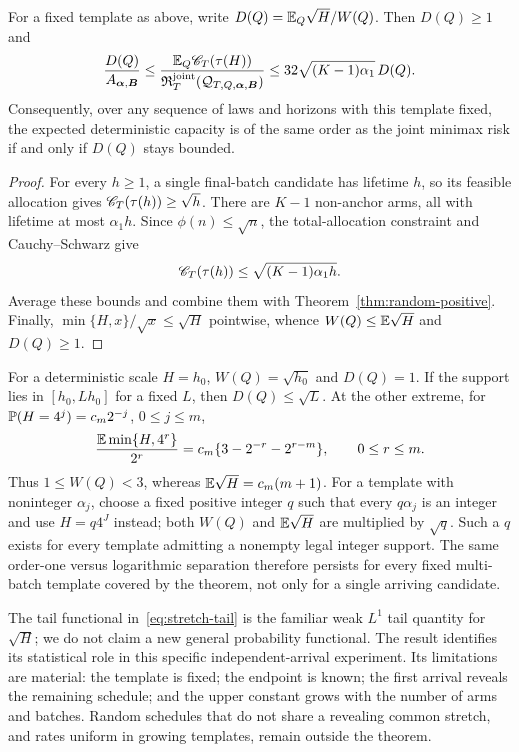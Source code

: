 \begin{corollary}
\label{cor:stretch-capacity}
For a fixed template as above, write
$D(Q)=\mathbb E_Q\sqrt H/W(Q)$. Then $D(Q)\ge1$ and
\begin{equation}
 \frac{D(Q)}{A_{\boldsymbol\alpha,\boldsymbol B}}
 \le
 \frac{\mathbb E_Q\mathscr C_T(\tau(H))}
      {\mathfrak R_T^{\mathrm{joint}}
       (\mathcal Q_{T,Q,\boldsymbol\alpha,\boldsymbol B})}
 \le32\sqrt{(K-1)\alpha_1}\,D(Q).
 \label{eq:stretch-capacity-ratio}
\end{equation}
Consequently, over any sequence of laws and horizons with this
template fixed, the expected deterministic capacity is of the same
order as the joint minimax risk if and only if $D(Q)$ stays bounded.
\end{corollary}

\begin{proof}
For every $h\ge1$, a single final-batch candidate has lifetime $h$,
so its feasible allocation gives $\mathscr C_T(\tau(h))\ge\sqrt h$.
There are $K-1$ non-anchor arms, all with lifetime at most
$\alpha_1h$. Since $\phi(n)\le\sqrt n$, the total-allocation
constraint and Cauchy--Schwarz give
\[
 \mathscr C_T(\tau(h))
 \le\sqrt{(K-1)\alpha_1h}.
\]
Average these bounds and combine them with
Theorem~\ref{thm:random-positive}. Finally,
$\min\{H,x\}/\sqrt x\le\sqrt H$ pointwise, whence
$W(Q)\le\mathbb E\sqrt H$ and $D(Q)\ge1$.
\end{proof}

For a deterministic scale $H=h_0$, $W(Q)=\sqrt{h_0}$ and $D(Q)=1$.
If the support lies in $[h_0,Lh_0]$ for a fixed $L$, then
$D(Q)\le\sqrt L$. At the other extreme, for
$\mathbb P(H=4^j)=c_m2^{-j}$, $0\le j\le m$,
\[
 \frac{\mathbb E\min\{H,4^r\}}{2^r}
 =c_m\{3-2^{-r}-2^{r-m}\},\qquad0\le r\le m.
\]
Thus $1\le W(Q)<3$, whereas $\mathbb E\sqrt H=c_m(m+1)$.
For a template with noninteger $\alpha_j$, choose a fixed positive
integer $q$ such that every $q\alpha_j$ is an integer and use
$H=q4^J$ instead; both $W(Q)$ and $\mathbb E\sqrt H$ are multiplied by
$\sqrt q$. Such a $q$ exists for every template admitting a nonempty
legal integer support.
The same order-one versus logarithmic separation therefore persists
for every fixed multi-batch template covered by the theorem, not
only for a single arriving candidate.

The tail functional in~\eqref{eq:stretch-tail} is the familiar weak
$L^1$ tail quantity for $\sqrt H$; we do not claim a new general
probability functional. The result identifies its statistical role in this
specific independent-arrival experiment. Its limitations are material:
the template is fixed; the endpoint is known; the first arrival
reveals the remaining schedule; and the upper constant grows with
the number of arms and batches. Random schedules that do not share a
revealing common stretch, and rates uniform in growing templates,
remain outside the theorem.
